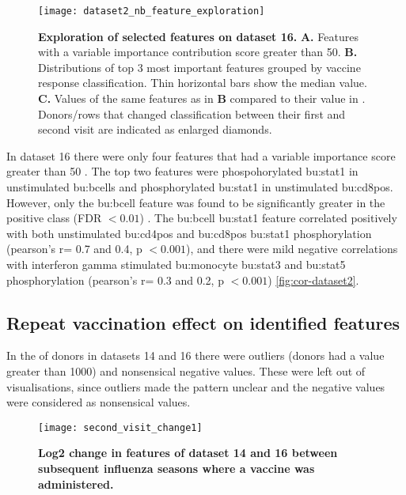 \begin{figure}[htpb]
    \centering
    \texttt{[image: dataset2\_nb\_feature\_exploration]}
    \caption{
        \textbf{Exploration of selected features on dataset 16.}
        \textbf{A.} Features with a variable importance contribution score greater than 50.
        \textbf{B.} Distributions of top 3 most important features grouped by vaccine response classification.
        Thin horizontal bars show the median value.
        \textbf{C.} Values of the same features as in \textbf{B} compared to their value in \secondvis.
        Donors/rows that changed classification between their first and second visit are indicated as enlarged diamonds.
    }\label{fig:dataset2-nb-feature-exploration}
\end{figure}

In dataset 16 there were only four features that had a variable importance score greater than 50 .
The top two features were phospohorylated \gls{bu:stat}1 in unstimulated \gls{bu:bcell}s and phosphorylated \gls{bu:stat}1 in unstimulated \gls{bu:cd8pos}.
However, only the \gls{bu:bcell} feature was found to be significantly greater in the positive class (FDR \(< 0.01\)) .
The \gls{bu:bcell} \gls{bu:stat}1 feature correlated positively with both unstimulated \gls{bu:cd4pos} and \gls{bu:cd8pos} \gls{bu:stat}1 phosphorylation (pearson's r= 0.7 and 0.4, p \(< 0.001\)), and there were mild negative correlations with interferon gamma stimulated \gls{bu:monocyte} \gls{bu:stat}3 and \gls{bu:stat}5 phosphorylation (pearson's r= 0.3 and 0.2, p \(< 0.001\)) \autoref{fig:cor-dataset2}.

\subsection{Repeat vaccination effect on identified features}

In the \secondvis of donors in datasets 14 and 16 there were outliers (donors had a value greater than 1000) and nonsensical negative values.
These were left out of visualisations, since outliers made the pattern unclear and the negative values were considered as nonsensical values.

\begin{figure}[htpb]
    \centering
    \texttt{[image: second\_visit\_change1]}
    \caption{
        \textbf{Log2 change in features of dataset 14 and 16 between subsequent influenza seasons where a vaccine was administered.}
    }\label{fig:second-visit-change1}
\end{figure}

